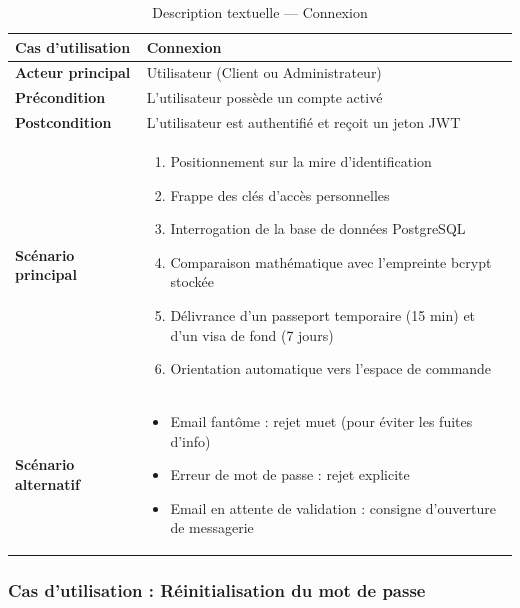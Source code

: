 \begin{table}[H]
    \centering
    \caption{Description textuelle --- Connexion}
    \label{tab:desc_connexion}
    \renewcommand{\arraystretch}{1.3}
    \begin{tabular}{|p{4cm}|p{8.5cm}|}
        \hline
        \textbf{Cas d'utilisation} & Connexion \\
        \hline
        \textbf{Acteur principal} & Utilisateur (Client ou Administrateur) \\
        \hline
        \textbf{Précondition} & L'utilisateur possède un compte activé \\
        \hline
        \textbf{Postcondition} & L'utilisateur est authentifié et reçoit un jeton JWT \\
        \hline
        \textbf{Scénario principal} &
        \begin{enumerate}
            \item Positionnement sur la mire d'identification
            \item Frappe des clés d'accès personnelles
            \item Interrogation de la base de données PostgreSQL
            \item Comparaison mathématique avec l'empreinte bcrypt stockée
            \item Délivrance d'un passeport temporaire (15 min) et d'un visa de fond (7 jours)
            \item Orientation automatique vers l'espace de commande
        \end{enumerate} \\
        \hline
        \textbf{Scénario alternatif} &
        \begin{itemize}
            \item[3a.] Email fantôme : rejet muet (pour éviter les fuites d'info)
            \item[4a.] Erreur de mot de passe : rejet explicite
            \item[3b.] Email en attente de validation : consigne d'ouverture de messagerie
        \end{itemize} \\
        \hline
    \end{tabular}
\end{table}

\subsubsection{Cas d'utilisation : Réinitialisation du mot de passe}

